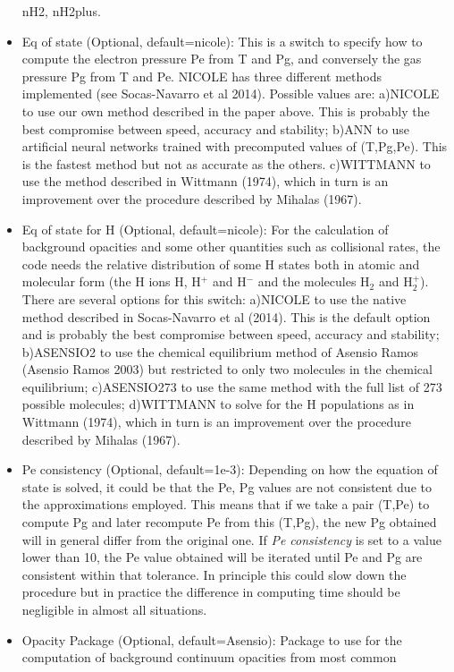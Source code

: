 \begin{itemize}
  nH2, nH2plus.
\item Eq of state (Optional, default=nicole): This is a switch to
  specify how to compute the electron pressure Pe from T and Pg, and
  conversely the gas pressure Pg from T and Pe. NICOLE has three
  different methods implemented (see Socas-Navarro et al
  2014). Possible values are: a)NICOLE to use our own method described
  in the paper above. This is probably the best compromise between
  speed, accuracy and stability; b)ANN to use artificial neural
  networks trained with precomputed values of (T,Pg,Pe). This is the
  fastest method but not as accurate as the others. c)WITTMANN to use
  the method described in Wittmann (1974), which in turn is an
  improvement over the procedure described by Mihalas (1967).
\item Eq of state for H (Optional, default=nicole): For the
  calculation of background opacities and some other quantities such
  as collisional rates, the code needs the relative distribution of
  some H states both in atomic and molecular form (the H ions H, H$^+$
  and H$^-$ and the molecules H$_2$ and H$_2^+$). There are several
  options for this switch: a)NICOLE to use the native method described
  in Socas-Navarro et al (2014). This is the default option and is
  probably the best compromise between speed, accuracy and stability;
  b)ASENSIO2 to use the chemical equilibrium method of Asensio Ramos
  (Asensio Ramos 2003) but restricted to only two molecules in the
  chemical equilibrium; c)ASENSIO273 to use the same method with the
  full list of 273 possible molecules; d)WITTMANN to solve for the H
  populations as in Wittmann (1974), which in turn is an improvement
  over the procedure described by Mihalas (1967).
\item Pe consistency (Optional, default=1e-3): Depending on how the
  equation of state is solved, it could be that the Pe, Pg values are
  not consistent due to the approximations employed. This means that
  if we take a pair (T,Pe) to compute Pg and later recompute Pe from
  this (T,Pg), the new Pg obtained will in general differ from the
  original one. If {\em Pe consistency} is set to a value lower than
  10, the Pe value obtained will be iterated until Pe and Pg are
  consistent within that tolerance. In principle this could slow down
  the procedure but in practice the difference in computing time
  should be negligible in almost all situations.
\item Opacity Package (Optional, default=Asensio): Package to use for
  the computation of background continuum opacities from most common

\end{itemize}
